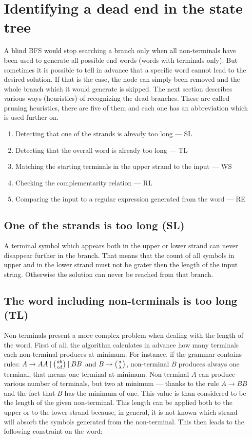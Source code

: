 \section{Identifying a dead end in the state tree}
A blind BFS would stop searching a branch only when all non-terminals have been used to generate all possible end words (words with terminals only). But sometimes it is possible to tell in advance that a specific word cannot lead to the desired solution. If that is the case, the node can simply been removed and the whole branch which it would generate is skipped. The next section describes various ways (heuristics) of recognizing the dead branches. These are called pruning heuristics, there are five of them and each one has an abbreviation which is used further on.

\begin{enumerate}
  \item{Detecting that one of the strands is already too long --- SL}
  \item{Detecting that the overall word is already too long --- TL}
  \item{Matching the starting terminals in the upper strand to the input --- WS}
  \item{Checking the complementarity relation --- RL}
  \item{Comparing the input to a regular expression generated from the word --- RE}
\end{enumerate}


\subsection{One of the strands is too long (SL)}
A terminal symbol which appears both in the upper or lower strand can never disappear further in the branch. That means that the count of all symbols in upper and in the lower strand must not be grater then the length of the input string. Otherwise the solution can never be reached from that branch.

\subsection{The word including non-terminals is too long (TL)}
Non-terminals present a more complex problem when dealing with the length of the word. First of all, the algorithm calculates in advance how many terminals each non-terminal produces at minimum. For instance, if the grammar contains rules: $A \rightarrow A A \:|\: \wkpair{ab}{cd} \:|\: B B$ and $B \rightarrow \wkpair{a}{\lambda}$, non-terminal $B$ produces always one terminal, that means one terminal at minimum. Non-terminal $A$ can produce various number of terminals, but two at minimum --- thanks to the rule $A \rightarrow B B$ and the fact that $B$ has the minimum of one. This value is than considered to be the length of the given non-terminal.
This length can be applied both to the upper or to the lower strand because, in general, it is not known which strand will absorb the symbols generated from the non-terminal.
This then leads to the following constraint on the word:

